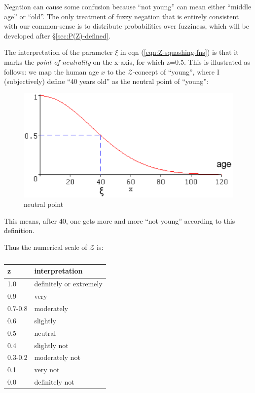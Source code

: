 Negation can cause some confusion because ``not young'' can mean either ``middle age'' or ``old''.  The only treatment of fuzzy negation that is entirely consistent with our common-sense is to distribute probabilities over fuzziness,  which will be developed after \S\ref{sec:P(Z)-defined}.

The interpretation of the parameter $\xi$ in eqn (\ref{eqn:Z-squashing-fns}) is that it marks the \textit{point of neutrality} on the x-axis, for which z=0.5.  This is illustrated as follows:  we map the human age $x$ to the $\mathcal{Z}$-concept of ``young'', where I (subjectively) define ``40 years old'' as the neutral point of ``young'':
\begin{figure}[H]
\centering
\includegraphics[scale=0.7]{NeutralPoint.eps}
\caption{neutral point}
\end{figure}
This means, after 40, one gets more and more ``not young'' according to this definition.  

Thus the numerical scale of $\mathcal{Z}$ is:\\
\begin{table}[H]
\parbox{3cm}{\caption{}}
\begin{tabular}{|l||l|}
\hline
{\bfseries z} & {\bfseries interpretation}\\ \hline
1.0     & definitely or extremely\\
0.9     & very\\
0.7-0.8 & moderately\\
0.6     & slightly\\ \hline
0.5     & neutral\\ \hline
0.4     & slightly not\\
0.3-0.2 & moderately not\\
0.1     & very not\\
0.0     & definitely not\\ \hline
\end{tabular}
\end{table}

